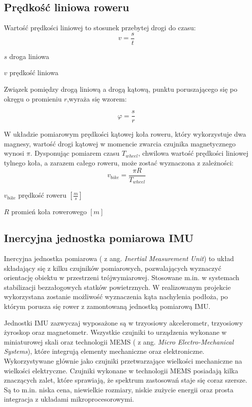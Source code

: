 \subsection{Prędkość liniowa roweru}
Wartość prędkości liniowej to stosunek przebytej drogi do czasu:
\begin{equation}
    v = \frac{s}{t}
\end{equation}
\begin{eqwhere}[2cm]
	\item[$s$] droga liniowa
	\item[$v$] prędkość liniowa
\end{eqwhere}
 Związek pomiędzy drogą liniową a drogą kątową, punktu poruszającego się po okręgu o promieniu $r$,wyraża się wzorem:

\begin{equation}
    \varphi = \frac{s}{r}
\end{equation}

W układzie pomiarowym prędkości kątowej koła roweru, który wykorzystuje dwa magnesy, wartość drogi kątowej w momencie zwarcia czujnika magnetycznego wynosi $\pi$. Dysponując pomiarem czasu $T_{wheel}$, chwilowa wartość prędkości liniowej tylnego koła, a zarazem całego roweru, może zostać wyznaczona z zależności:
 \begin{equation}
    \label{eq:zaleznoscNaPredkosc}
    v_{bike} = \frac{\pi R}{T_{wheel}}
\end{equation}
\begin{eqwhere}[2cm]
    \item[$v_{bike}$] prędkość roweru $[\frac{m}{s}]$
	\item[$R$] promień koła rowerowego $[m]$
\end{eqwhere}
\subsection{Inercyjna jednostka pomiarowa IMU}
Inercyjna jednostka pomiarowa ( z ang. {\em Inertial Measurement Unit}) to układ składający się z kilku czujników pomiarowych, pozwalających wyznaczyć orientację obiektu w przestrzeni trójwymiarowej. Stosowane m.in. w systemach stabilizacji bezzałogowych statków powietrznych. W realizowanym projekcie wykorzystana zostanie możliwość wyznaczenia kąta nachylenia podłoża, po którym porusza się rower z zamontowaną jednostką pomiarową IMU.

Jednostki IMU zazwyczaj wyposażone są w trzyosiowy akcelerometr, trzyosiowy żyroskop oraz magnetometr. Wszystkie czujniki to urządzenia wykonane w miniaturowej skali oraz technologii MEMS ( z ang. {\em Micro Electro-Mechanical Systems}), które integrują elementy mechaniczne oraz elektroniczne. Wykorzystywane głównie jako czujniki przetwarzające wielkości mechaniczne na wielkości elektryczne. Czujniki wykonane w technologii MEMS posiadają kilka znaczących zalet, które sprawiają, że spektrum zastosowań staje się coraz szersze. Są to m.in. niska cena, niewielkie rozmiary, niskie zużycie energii oraz prosta integracja z układami mikroprocesorowymi. 

